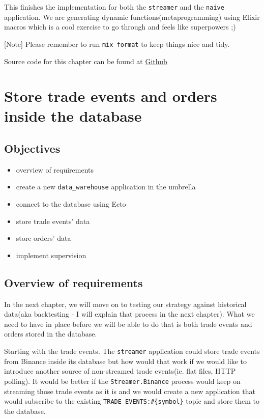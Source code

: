 \documentclass[
]{book}
\providecommand{\tightlist}{%
  \setlength{\itemsep}{0pt}\setlength{\parskip}{0pt}}
\begin{document}
This finishes the implementation for both the \texttt{streamer} and the \texttt{naive} application. We are generating dynamic functions(metaprogramming) using Elixir macros which is a cool exercise to go through and feels like superpowers ;)

{[}Note{]} Please remember to run \texttt{mix\ format} to keep things nice and tidy.

Source code for this chapter can be found at \href{https://github.com/frathon/create-a-cryptocurrency-trading-bot-in-elixir-source-code/tree/chapter_13}{Github}

\hypertarget{store-trade-events-and-orders-inside-the-database}{%
\chapter{Store trade events and orders inside the database}\label{store-trade-events-and-orders-inside-the-database}}

\hypertarget{objectives-13}{%
\section{Objectives}\label{objectives-13}}

\begin{itemize}
\tightlist
\item
  overview of requirements
\item
  create a new \texttt{data\_warehouse} application in the umbrella
\item
  connect to the database using Ecto
\item
  store trade events' data
\item
  store orders' data
\item
  implement supervision
\end{itemize}

\hypertarget{overview-of-requirements-1}{%
\section{Overview of requirements}\label{overview-of-requirements-1}}

In the next chapter, we will move on to testing our strategy against historical data(aka backtesting - I will explain that process in the next chapter). What we need to have in place before we will be able to do that is both trade events and orders stored in the database.

Starting with the trade events. The \texttt{streamer} application could store trade events from Binance inside its database but how would that work if we would like to introduce another source of non-streamed trade events(ie. flat files, HTTP polling). It would be better if the \texttt{Streamer.Binance} process would keep on streaming those trade events as it is and we would create a new application that would subscribe to the existing \texttt{TRADE\_EVENTS:\#\{symbol\}} topic and store them to the database.
\end{document}
